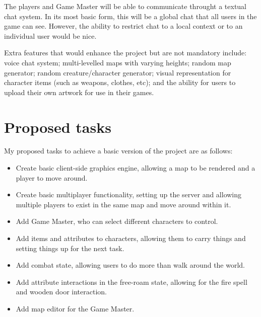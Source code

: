 The players and Game Master will be able to communicate throught a textual chat system. In its most basic form, this will be a global chat that all users in the game can see. However, the ability to restrict chat to a local context or to an individual user would be nice.

Extra features that would enhance the project but are not mandatory include: voice chat system; multi-levelled maps with varying heights; random map generator; random creature/character generator; visual representation for character items (such as weapons, clothes, etc); and the ability for users to upload their own artwork for use in their games.

\section{Proposed tasks}
My proposed tasks to achieve a basic version of the project are as follows:

\begin{itemize}
	\item{Create basic client-side graphics engine, allowing a map to be rendered and a player to move around.}
	\item{Create basic multiplayer functionality, setting up the server and allowing multiple players to exist in the same map and move around within it.}
	\item{Add Game Master, who can select different characters to control.}
	\item{Add items and attributes to characters, allowing them to carry things and setting things up for the next task.}
	\item{Add combat state, allowing users to do more than walk around the world.}
	\item{Add attribute interactions in the free-roam state, allowing for the fire spell and wooden door interaction.}
	\item{Add map editor for the Game Master.}
\end{itemize}

